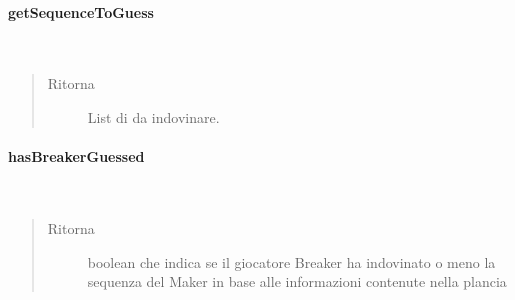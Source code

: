 \documentclass[letterpaper,10pt,italian,openany,oneside]{sphinxmanual}
\begin{document}
\paragraph{getSequenceToGuess}
\label{\detokenize{source/it/unicam/cs/pa/mastermind/gamecore/BoardModel:getsequencetoguess}}

\begin{fulllineitems}
\label{\detokenize{source/it/unicam/cs/pa/mastermind/gamecore/BoardModel:it.unicam.cs.pa.mastermind.gamecore.BoardModel.getSequenceToGuess()}}~\begin{quote}\begin{description}
\item[{Ritorna}] \leavevmode
List di  da indovinare.

\end{description}\end{quote}

\end{fulllineitems}



\paragraph{hasBreakerGuessed}
\label{\detokenize{source/it/unicam/cs/pa/mastermind/gamecore/BoardModel:hasbreakerguessed}}

\begin{fulllineitems}
\label{\detokenize{source/it/unicam/cs/pa/mastermind/gamecore/BoardModel:it.unicam.cs.pa.mastermind.gamecore.BoardModel.hasBreakerGuessed()}}~\begin{quote}\begin{description}
\item[{Ritorna}] \leavevmode
boolean che indica se il giocatore Breaker ha indovinato o meno la sequenza del Maker in base alle informazioni contenute nella plancia

\end{description}\end{quote}

\end{fulllineitems}
\end{document}
